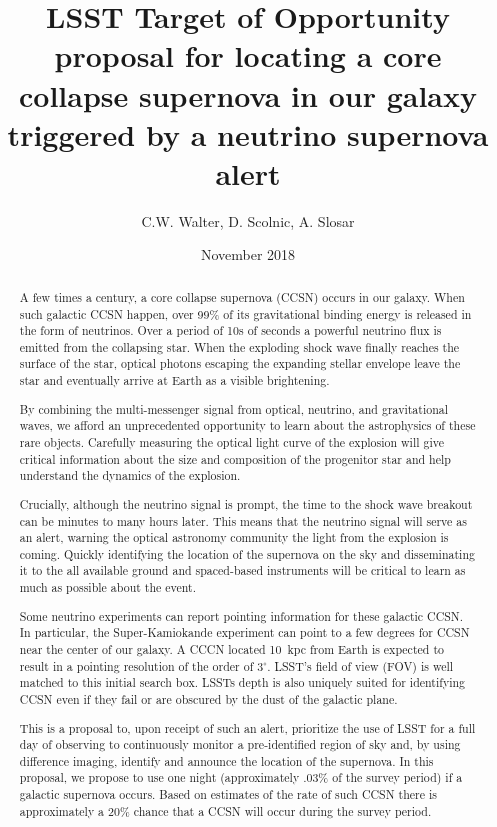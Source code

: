 \documentclass[11pt, letterpaper]{article}
\title{LSST Target of Opportunity proposal for locating a core collapse
  supernova in our galaxy triggered by a neutrino supernova alert}
\author{ C.W. Walter, D. Scolnic, A. Slosar}
\date{ November 2018}
\begin{document}
\maketitle

\begin{abstract}

  A few times a century, a core collapse supernova (CCSN) occurs in
  our galaxy. When such galactic CCSN happen, over 99\% of its
  gravitational binding energy is released in the form of neutrinos.
  Over a period of 10s of seconds a powerful neutrino flux is emitted
  from the collapsing star.  When the exploding shock wave finally
  reaches the surface of the star, optical photons escaping the
  expanding stellar envelope leave the star and eventually arrive at
  Earth as a visible brightening.

  By combining the multi-messenger signal from optical, neutrino, and
  gravitational waves, we afford an unprecedented opportunity to learn
  about the astrophysics of these rare objects. Carefully measuring
  the optical light curve of the explosion will give critical
  information about the size and composition of the progenitor star
  and help understand the dynamics of the explosion.

  Crucially, although the neutrino signal is prompt, the time to the
  shock wave breakout can be minutes to many hours later.  This means
  that the neutrino signal will serve as an alert, warning the
  optical astronomy community the light from the explosion is coming.  
  Quickly identifying the location of the supernova on the sky and
  disseminating it to the all available ground and spaced-based
  instruments will be critical to learn as much as possible about the
  event.

  Some neutrino experiments can report pointing information for these
  galactic CCSN. In particular, the Super-Kamiokande experiment can
  point to a few degrees for CCSN near the center of our galaxy.  A
  CCCN located 10~kpc from Earth is expected to result in a pointing
  resolution of the order of $3^\circ$.  LSST's field of view (FOV) is
  well matched to this initial search box.  LSSTs depth is also
  uniquely suited for identifying CCSN even if they fail or are
  obscured by the dust of the galactic plane.

  This is a proposal to, upon receipt of such an alert, prioritize the
  use of LSST for a full day of observing to continuously monitor a
  pre-identified region of sky and, by using difference imaging,
  identify and announce the location of the supernova. In this
  proposal, we propose to use one night (approximately .03\% of the
  survey period) if a galactic supernova occurs.  Based on estimates
  of the rate of such CCSN there is approximately a 20\% chance that a
  CCSN will occur during the survey period.
  
\end{abstract}
\end{document}
